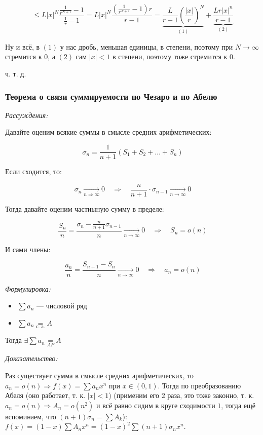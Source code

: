 \documentclass{article}
\def\eqby#1{\underset{#1}{=}}
\begin{document}
\[\le L |x|^N\frac{\frac{1}{r^{N + 1}} - 1}{\frac{1}{r} - 1} =  L |x|^N\frac{(\frac{1}{r^{N + 1}} - 1)r}{r - 1} = \underbrace{\frac{L}{r - 1}\left(\frac{|x|}{r}\right)^{N}}_{(1)} + \underbrace{\frac{Lr|x|^n}{r - 1}}_{(2)}\]

Ну и всё, в $(1)$ у нас дробь, меньшая единицы, в степени, поэтому при $N \rightarrow \infty$ стремится к $0$, а $(2)$ сам $|x| < 1$ в степени, поэтому тоже стремится к $0$.

ч. т. д. 

\subsubsection{Теорема о связи суммируемости по Чезаро и по Абелю}

\textit{Рассуждения:}

Давайте оценим всякие суммы в смысле средних арифметических: 

\[\sigma_n = \frac{1}{n + 1}(S_1 + S_2 + \ldots + S_n)\]

Если сходится, то:

\[\sigma_n \underset{n \Longrightarrow \infty}{\longrightarrow} 0 \quad \Rightarrow \quad \frac{n}{n + 1} \cdot \sigma_{n - 1} \underset{n \rightarrow \infty}{\longrightarrow} 0\]

Тогда давайте оценим частиыную сумму в пределе:

\[\frac{S_n}{n} = \frac{\sigma_n - \frac{n}{n + 1}\sigma_{n - 1}}{n} \underset{n \rightarrow \infty}{\longrightarrow} 0 \quad \Longrightarrow \quad S_n = o(n)\]

И сами члены:

\[\frac{a_n}{n} = \frac{S_{n + 1} - S_{n}}{n} \underset{n \rightarrow \infty}{\longrightarrow} 0 \quad \Longrightarrow \quad a_n = o(n)\]

\textit{Формулировка:}

\begin{itemize}
    \item $\sum a_n$ --- числовой ряд
    \item $\sum a_n \eqby{\text{с. а.}} A$
\end{itemize}

Тогда $\exists \sum a_n \eqby{AP} A$

\textit{Доказательство:}

Раз существует сумма в смысле средних арифметических, то $a_n = o(n) \Rightarrow f(x) = \sum a_n x^n$ при $x \in (0, 1)$. Тогда по преобразованию Абеля (оно работает, т. к. $|x| < 1$) (применим его 2 раза, это тоже законно, т. к. $a_n = o(n) \Rightarrow A_n = o(n^2)$ и всё равно сидим в круге сходимости $1$, тогда ещё вспоминаем, что $(n + 1)\sigma_n = \sum A_k$): $f(x) = (1 - x)\sum A_n x^n = (1 - x)^2\sum (n + 1)\sigma_n x^n$. 
\end{document}
